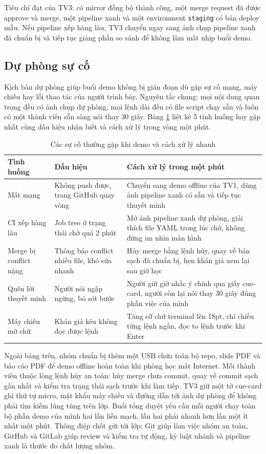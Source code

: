 Tiêu chí đạt của TV3: có mirror đồng bộ thành công, một merge request đã được approve và merge, một pipeline xanh và một environment \verb|staging| có bản deploy mẫu.
Nếu pipeline xếp hàng lâu, TV3 chuyển ngay sang ảnh chụp pipeline xanh đã chuẩn bị và tiếp tục giảng phần so sánh để không làm mất nhịp buổi demo.

\subsection{Dự phòng sự cố}
\label{subsec:phulucD-suphong}

Kịch bản dự phòng giúp buổi demo không bị gián đoạn dù gặp sự cố mạng, máy chiếu hay lỗi thao tác của người trình bày.
Nguyên tắc chung: mọi nội dung quan trọng đều có ảnh chụp dự phòng, mọi lệnh dài đều có file script chạy sẵn và luôn có một thành viên sẵn sàng nói thay 30 giây.
Bảng \ref{tab:phulucD-suphong} liệt kê 5 tình huống hay gặp nhất cùng dấu hiệu nhận biết và cách xử lý trong vòng một phút.

\begin{table}[H]
\centering
\caption{Các sự cố thường gặp khi demo và cách xử lý nhanh}
\label{tab:phulucD-suphong}
\begin{tabular}{p{2.6cm}p{4.2cm}p{5.8cm}}
\toprule
Tình huống & Dấu hiệu & Cách xử lý trong một phút \\
\midrule
Mất mạng & Không push được, trang GitHub quay vòng & Chuyển sang demo offline của TV1, dùng ảnh pipeline xanh có sẵn và tiếp tục thuyết minh \\
CI xếp hàng lâu & Job treo ở trạng thái chờ quá 2 phút & Mở ảnh pipeline xanh dự phòng, giải thích file YAML trong lúc chờ, không đứng im nhìn màn hình \\
Merge bị conflict nặng & Thông báo conflict nhiều file, khó sửa nhanh & Hủy merge bằng lệnh hủy, quay về bản sạch đã chuẩn bị, hẹn khán giả xem lại sau giờ học \\
Quên lời thuyết minh & Người nói ngập ngừng, bỏ sót bước & Người giữ giờ nhắc ý chính qua giấy cue-card, người còn lại nói thay 30 giây đúng phần việc của mình \\
Máy chiếu mờ chữ & Khán giả kêu không đọc được lệnh & Tăng cỡ chữ terminal lên 18pt, chỉ chiếu từng lệnh ngắn, đọc to lệnh trước khi Enter \\
\bottomrule
\end{tabular}
\end{table}

Ngoài bảng trên, nhóm chuẩn bị thêm một USB chứa toàn bộ repo, slide PDF và báo cáo PDF để demo offline hoàn toàn khi phòng học mất Internet.
Mỗi thành viên thuộc lòng lệnh hủy an toàn: hủy merge chưa commit, quay về commit sạch gần nhất và kiểm tra trạng thái sạch trước khi làm tiếp.
TV3 giữ một tờ cue-card ghi thứ tự micro, mật khẩu máy chiếu và đường dẫn tới ảnh dự phòng để không phải tìm kiếm lúng túng trên lớp.
Buổi tổng duyệt yêu cầu mỗi người chạy toàn bộ phần demo của mình hai lần liền mạch, lần hai phải nhanh hơn lần một ít nhất một phút.
Thông điệp chốt gửi tới lớp: Git giúp làm việc nhóm an toàn, GitHub và GitLab giúp review và kiểm tra tự động, kỷ luật nhánh và pipeline xanh là thước đo chất lượng nhóm.
